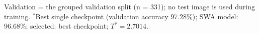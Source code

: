 Validation = the grouped validation split (n = 331); no test image is used during training. $^{\ast}$Best single checkpoint (validation accuracy 97.28\%); SWA model: 96.68\%; selected: best checkpoint; $T^{*}=2.7014$.
